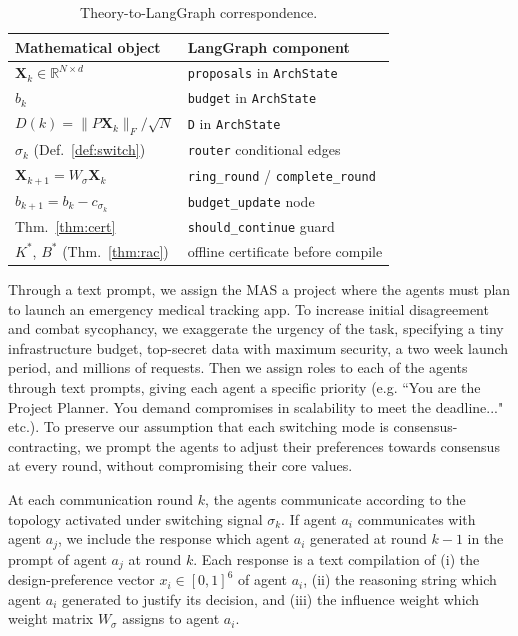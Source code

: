 \documentclass[journal,twoside,web]{ieeecolor_no_firstpage_logo}
\begin{document}
\begin{table}[h]
\centering
\caption{Theory-to-LangGraph correspondence.}
\label{tab:mapping}
\setlength{\tabcolsep}{4pt}
\footnotesize
\begin{tabular}{ll}
\toprule
Mathematical object & LangGraph component \\
\midrule
$\mathbf{X}_k\in\mathbb{R}^{N\times d}$       & \texttt{proposals} in \texttt{ArchState} \\
$b_k$                          & \texttt{budget} in \texttt{ArchState} \\
$D(k)=\|P\mathbf{X}_k\|_F/\!\sqrt{N}$& \texttt{D} in \texttt{ArchState} \\
$\sigma_k$ (Def.~\ref{def:switch})& \texttt{router} conditional edges \\
$\mathbf{X}_{k+1}=W_\sigma\mathbf{X}_k$      & \texttt{ring\_round} / \texttt{complete\_round} \\
$b_{k+1}=b_k-c_{\sigma_k}$    & \texttt{budget\_update} node \\
Thm.~\ref{thm:cert}         & \texttt{should\_continue} guard \\
$K^*$, $B^*$ (Thm.~\ref{thm:rac})& offline certificate before compile \\
\bottomrule
\end{tabular}
\end{table}

Through a text prompt, we assign the MAS a project where the agents must plan to launch an emergency medical tracking app. To increase initial disagreement and combat sycophancy, we exaggerate the urgency of the task, specifying a tiny infrastructure budget, top-secret data with maximum security, a two week launch period, and millions of requests. Then we assign roles to each of the agents through text prompts, giving each agent a specific priority (e.g. ``You are the Project Planner. You demand compromises in scalability to meet the deadline..." etc.). To preserve our assumption that each switching mode is consensus-contracting, we prompt the agents to adjust their preferences towards consensus at every round, without compromising their core values. 

At each communication round $k$, the agents communicate according to the topology activated under switching signal $\sigma_k.$ If agent $a_i$ communicates with agent $a_j$, we include the response which agent $a_i$ generated at round $k-1$ in the prompt of agent $a_j$ at round $k$. Each response is a text compilation of (i) the design-preference vector $x_i \in [0,1]^6 $ of agent $a_i$, (ii) the reasoning string which agent $a_i$ generated to justify its decision, and (iii) the influence weight which weight matrix $W_\sigma$ assigns to agent $a_i$. 
\end{document}
